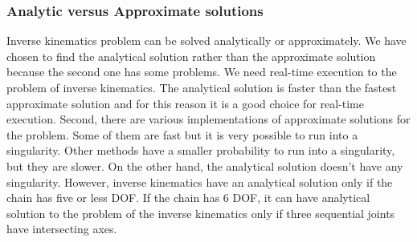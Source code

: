 \subsubsection*{Analytic versus Approximate solutions}
Inverse kinematics problem can be solved analytically or approximately. We have chosen to find the analytical solution rather than the approximate solution because the second one has some problems. We need real-time execution to the problem of inverse kinematics. The analytical solution is faster than the fastest approximate solution and for this reason it is a good choice for real-time execution. Second, there are various implementations of approximate solutions for the problem. Some of them are fast but it is very possible to run into a singularity. Other methods have a smaller probability to run into a singularity, but they are slower. On the other hand, the analytical solution doesn't have any singularity. However, inverse kinematics have an analytical solution only if the chain has five or less DOF. If the chain has 6 DOF, it can have analytical solution to the problem of the inverse kinematics only if three sequential joints have intersecting axes.

